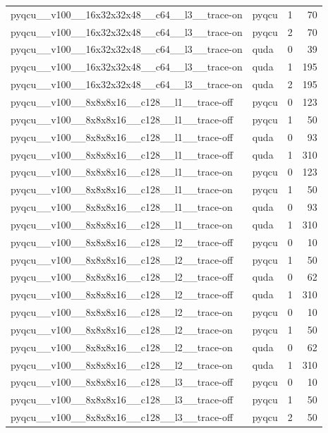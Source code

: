 \begin{table}[htbp]
\begin{tabular}{@{}llrr@{}}
pyqcu\_\_v100\_\_16x32x32x48\_\_c64\_\_l3\_\_trace-on & pyqcu & 1 & 70 \\
pyqcu\_\_v100\_\_16x32x32x48\_\_c64\_\_l3\_\_trace-on & pyqcu & 2 & 70 \\
pyqcu\_\_v100\_\_16x32x32x48\_\_c64\_\_l3\_\_trace-on & quda & 0 & 39 \\
pyqcu\_\_v100\_\_16x32x32x48\_\_c64\_\_l3\_\_trace-on & quda & 1 & 195 \\
pyqcu\_\_v100\_\_16x32x32x48\_\_c64\_\_l3\_\_trace-on & quda & 2 & 195 \\
pyqcu\_\_v100\_\_8x8x8x16\_\_c128\_\_l1\_\_trace-off & pyqcu & 0 & 123 \\
pyqcu\_\_v100\_\_8x8x8x16\_\_c128\_\_l1\_\_trace-off & pyqcu & 1 & 50 \\
pyqcu\_\_v100\_\_8x8x8x16\_\_c128\_\_l1\_\_trace-off & quda & 0 & 93 \\
pyqcu\_\_v100\_\_8x8x8x16\_\_c128\_\_l1\_\_trace-off & quda & 1 & 310 \\
pyqcu\_\_v100\_\_8x8x8x16\_\_c128\_\_l1\_\_trace-on & pyqcu & 0 & 123 \\
pyqcu\_\_v100\_\_8x8x8x16\_\_c128\_\_l1\_\_trace-on & pyqcu & 1 & 50 \\
pyqcu\_\_v100\_\_8x8x8x16\_\_c128\_\_l1\_\_trace-on & quda & 0 & 93 \\
pyqcu\_\_v100\_\_8x8x8x16\_\_c128\_\_l1\_\_trace-on & quda & 1 & 310 \\
pyqcu\_\_v100\_\_8x8x8x16\_\_c128\_\_l2\_\_trace-off & pyqcu & 0 & 10 \\
pyqcu\_\_v100\_\_8x8x8x16\_\_c128\_\_l2\_\_trace-off & pyqcu & 1 & 50 \\
pyqcu\_\_v100\_\_8x8x8x16\_\_c128\_\_l2\_\_trace-off & quda & 0 & 62 \\
pyqcu\_\_v100\_\_8x8x8x16\_\_c128\_\_l2\_\_trace-off & quda & 1 & 310 \\
pyqcu\_\_v100\_\_8x8x8x16\_\_c128\_\_l2\_\_trace-on & pyqcu & 0 & 10 \\
pyqcu\_\_v100\_\_8x8x8x16\_\_c128\_\_l2\_\_trace-on & pyqcu & 1 & 50 \\
pyqcu\_\_v100\_\_8x8x8x16\_\_c128\_\_l2\_\_trace-on & quda & 0 & 62 \\
pyqcu\_\_v100\_\_8x8x8x16\_\_c128\_\_l2\_\_trace-on & quda & 1 & 310 \\
pyqcu\_\_v100\_\_8x8x8x16\_\_c128\_\_l3\_\_trace-off & pyqcu & 0 & 10 \\
pyqcu\_\_v100\_\_8x8x8x16\_\_c128\_\_l3\_\_trace-off & pyqcu & 1 & 50 \\
pyqcu\_\_v100\_\_8x8x8x16\_\_c128\_\_l3\_\_trace-off & pyqcu & 2 & 50 \\

\end{tabular}
\end{table}
